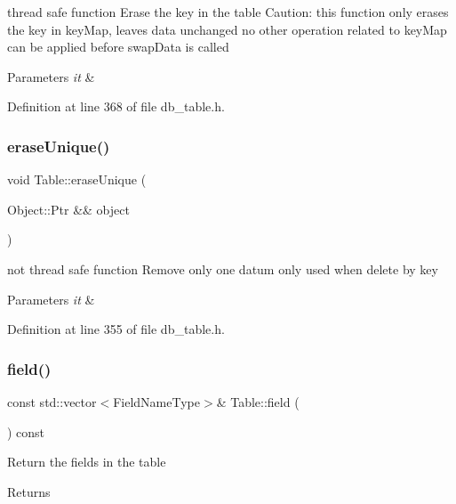thread safe function Erase the key in the table Caution\+: this function only erases the key in key\+Map, leaves data unchanged no other operation related to key\+Map can be applied before swap\+Data is called 
\begin{DoxyParams}{Parameters}
{\em it} & \\
\hline
\end{DoxyParams}


Definition at line 368 of file db\+\_\+table.\+h.

\mbox{\label{class_table_ad0e71468c62bca660627296be71dc590}} 
\subsubsection{\texorpdfstring{erase\+Unique()}{eraseUnique()}}
{\footnotesize\ttfamily void Table\+::erase\+Unique (\begin{DoxyParamCaption}\item[{Object\+::\+Ptr \&\&}]{object }\end{DoxyParamCaption})\hspace{0.3cm}{\ttfamily [inline]}}

not thread safe function Remove only one datum only used when delete by key 
\begin{DoxyParams}{Parameters}
{\em it} & \\
\hline
\end{DoxyParams}


Definition at line 355 of file db\+\_\+table.\+h.

\mbox{\label{class_table_ab68bc133d1d01f516d0bfb1a9c06e40f}} 
\subsubsection{\texorpdfstring{field()}{field()}}
{\footnotesize\ttfamily const std\+::vector$<$Field\+Name\+Type$>$\& Table\+::field (\begin{DoxyParamCaption}{ }\end{DoxyParamCaption}) const\hspace{0.3cm}{\ttfamily [inline]}}

Return the fields in the table \begin{DoxyReturn}{Returns}

\end{DoxyReturn}


